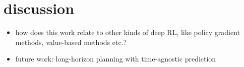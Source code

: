 \section{discussion}

\begin{itemize}
    \item how does this work relate to other kinds of deep RL, like policy gradient methods, value-based methods etc.?
    \item future work: 
    \subitem long-horizon planning with time-agnostic prediction
    
\end{itemize}